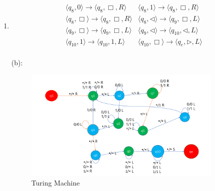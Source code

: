 \documentclass[12pt,a4paper]{article}
\makeatletter
\newtheorem*{solution}{Solution}
\theoremstyle{definition}
\renewenvironment{solution}[1][Solution] {\par\pushQED{\qed}\normalfont\topsep6\p@\@plus6\p@\relax\trivlist\item[\hskip\labelsep\bfseries#1\@addpunct{.}]\ignorespaces}{\popQED\endtrivlist\@endpefalse} \makeatother
\makeatother
\begin{document}
\begin{enumerate}
\begin{solution}
\begin{equation*}
\begin{aligned}
        & \langle q_8, 0 \rangle  \rightarrow  \langle q_8, \Box, R\rangle
        & \langle q_8, 1 \rangle  \rightarrow  \langle q_8, \Box, R\rangle \\
        & \langle q_8, \Box \rangle  \rightarrow  \langle q_8, \Box, R\rangle 
        & \langle q_8, \triangleleft \rangle  \rightarrow  \langle q_9, \Box, L\rangle \\
        & \langle q_9, \Box \rangle  \rightarrow  \langle q_9, \Box, L\rangle
        & \langle q_9, \triangleleft \rangle  \rightarrow  \langle q_{10}, \triangleleft, L\rangle  \\
        & \langle q_{10}, 1 \rangle  \rightarrow  \langle q_{10}, 1, L\rangle
        & \langle q_{10}, \Box \rangle  \rightarrow  \langle q_e, \triangleright, L\rangle  \\
        
        
        
        
        
        
        
        
        \end{aligned}
    \end{equation*}
    
    
    
    (b):\\
    		\begin{figure}[!htbp]
			\centering
			\includegraphics[width=0.9\textwidth]{pic.pdf}
			\caption{Turing Machine}
			\label{ }
		\end{figure}
    

\end{solution}
\end{enumerate}
\end{document}
